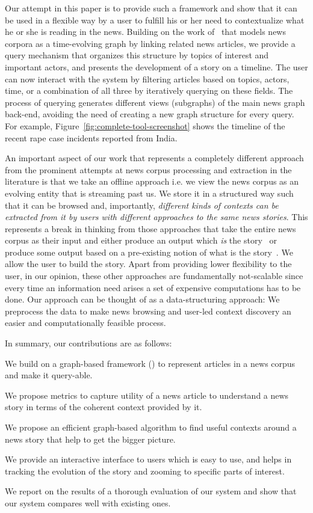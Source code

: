 Our attempt in this paper is to provide such a framework and show that
it can be used in a flexible way by a user to fulfill his or her need
to contextualize what he or she is reading in the news.  Building on
the work of~\cite{choudhary@ecir2008} that models news corpora as a
time-evolving graph by linking related news articles, we provide a
query mechanism that organizes this structure by topics of interest
and important actors, and presents the development of a story on a
timeline. The user can now interact with the system by filtering
articles based on topics, actors, time, or a combination of all
three by iteratively querying on these fields. The process of querying generates different views (subgraphs) of the main news graph back-end, 
avoiding the need of creating a new graph structure for every query.
For example, Figure~\ref{fig:complete-tool-screenshot} shows
the timeline of the recent rape case incidents reported from India.

An important aspect of our work that represents a completely different
approach from the prominent attempts at news corpus processing and
extraction in the literature is that we take an offline approach
i.e. we view the news corpus as an evolving entity that is streaming
past us. We store it in a structured way such that it can be browsed
and, importantly, {\em different kinds of contexts can be extracted
  from it by users with different approaches to the same news
  stories}. This represents a break in thinking from those approaches
that take the entire news corpus as their input and either produce an
output which {\em is} the story~\cite{shahaf@kdd2010,shahaf@www2012}
or produce some output based on a pre-existing notion of what is the
story~\cite{subasic-icdm:2008,subasic-ida:2013}. We allow the user to
build the story. Apart from providing lower flexibility to the user,
in our opinion, these other approaches are fundamentally not-scalable
since every time an information need arises a set of expensive
computations has to be done. Our approach can be thought of as a
data-structuring approach: We preprocess the data to make news
browsing and user-led context discovery an easier and computationally
feasible process.

In summary, our contributions are as follows:
\squishlist
\item We build on a graph-based framework (\cite{choudhary@ecir2008}) to represent articles in a news corpus and make it query-able. 
\item We propose metrics to capture utility of a news article to understand a news story in terms of the coherent context provided by it.
\item We propose an efficient graph-based algorithm to find useful contexts around a news story that help to get the bigger picture.
\item We provide an interactive interface to users which is easy to use, and helps in tracking the evolution of the story and zooming
  to specific parts of interest.
\item We report on the results of a thorough evaluation of our system and show that our system compares well with existing ones.
\squishend

